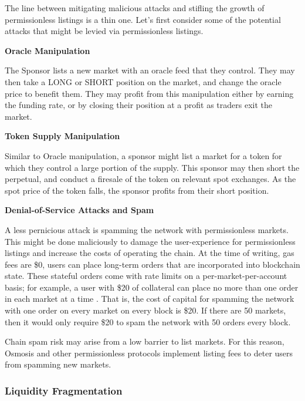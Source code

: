             The line between mitigating malicious attacks and stifling the growth of permissionless listings is a thin one. Let's first consider some of the potential attacks that might be levied via permissionless listings.

            \textbf{Oracle Manipulation}

            The Sponsor lists a new market with an oracle feed that they control. They may then take a LONG or SHORT position on the market, and change the oracle price to benefit them. They may profit from this manipulation either by earning the funding rate, or by closing their position at a profit as traders exit the market.

            \textbf{Token Supply Manipulation}

            Similar to Oracle manipulation, a sponsor might list a market for a token for which they control a large portion of the supply. This sponsor may then short the perpetual, and conduct a firesale of the token on relevant spot exchanges. As the spot price of the token falls, the sponsor profits from their short position.

            \textbf{Denial-of-Service Attacks and Spam}

            A less pernicious attack is spamming the network with permissionless markets. This might be done maliciously to damage the user-experience for permissionless listings and increase the costs of operating the chain. At the time of writing, gas fees are \$0, users can place long-term orders that are incorporated into blockchain state. These stateful orders come with rate limits on a per-market-per-account basis; for example, a user with \$20 of collateral can place no more than one order in each market at a time \cite{otherApiLimits}. That is, the cost of capital for spamming the network with one order on every market on every block is \$20. If there are 50 markets, then it would only require \$20 to spam the network with 50 orders every block.
            
            Chain spam risk may arise from a low barrier to list markets. For this reason, Osmosis and other permissionless protocols implement listing fees to deter users from spamming new markets.

        \subsubsection{Liquidity Fragmentation}

